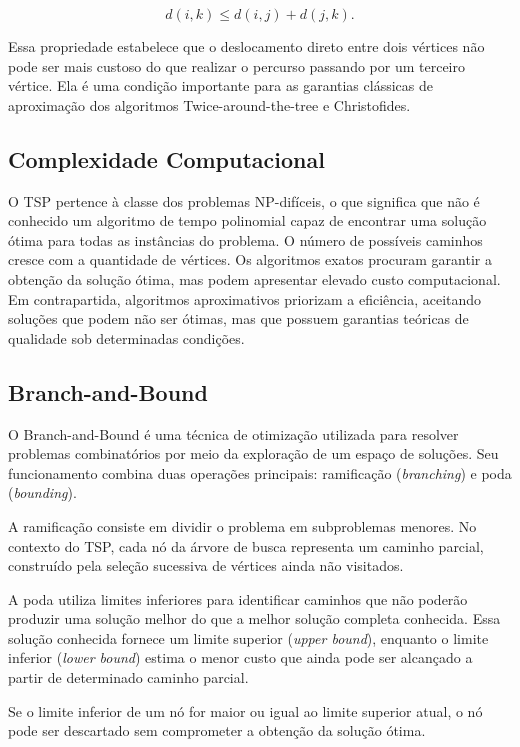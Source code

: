 \documentclass[12pt]{article}
\begin{document}
\begin{equation}
d(i,k)\leq d(i,j)+d(j,k).
\label{eq:desigualdade-triangular}
\end{equation}

Essa propriedade estabelece que o deslocamento direto entre dois
vértices não pode ser mais custoso do que realizar o percurso passando
por um terceiro vértice. Ela é uma condição importante para as garantias
clássicas de aproximação dos algoritmos Twice-around-the-tree e
Christofides.

\subsection{Complexidade Computacional}

O TSP pertence à classe dos problemas NP-difíceis, o que significa que
não é conhecido um algoritmo de tempo polinomial capaz de encontrar uma
solução ótima para todas as instâncias do problema. O número de possíveis
caminhos cresce  com a quantidade de vértices. Os algoritmos exatos procuram garantir a obtenção da solução ótima, mas podem apresentar elevado custo computacional. Em contrapartida, algoritmos
aproximativos priorizam a eficiência, aceitando soluções que podem não
ser ótimas, mas que possuem garantias teóricas de qualidade sob
determinadas condições.

\subsection{ Branch-and-Bound}

O Branch-and-Bound é uma técnica de otimização utilizada para resolver
problemas combinatórios por meio da exploração  de um espaço
de soluções. Seu funcionamento combina duas operações principais:
ramificação (\textit{branching}) e poda (\textit{bounding}).

A ramificação consiste em dividir o problema em subproblemas menores.
No contexto do TSP, cada nó da árvore de busca representa um caminho
parcial, construído pela seleção sucessiva de vértices ainda não
visitados.

A poda utiliza limites inferiores para identificar caminhos que não
poderão produzir uma solução melhor do que a melhor solução completa
conhecida. Essa solução conhecida fornece um limite superior
(\textit{upper bound}), enquanto o limite inferior (\textit{lower bound})
estima o menor custo que ainda pode ser alcançado a partir de determinado
caminho parcial.

Se o limite inferior de um nó for maior ou igual ao limite superior
atual, o nó pode ser descartado sem comprometer a obtenção da solução
ótima. 
\end{document}
